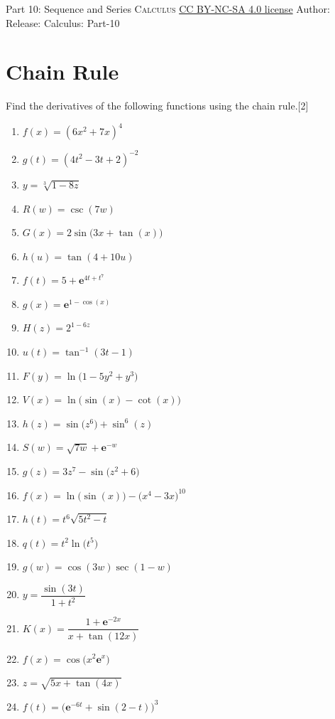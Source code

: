 \newpage\handout
{Part 10: Sequence and Series}
{\textsc{Calculus}}
{\href{https://creativecommons.org/licenses/by-nc-sa/4.0/}{CC BY-NC-SA 4.0 license}}
{Author: \BookAuthor}{Release: \generatedOn}
{Calculus: Part-10}




\section*{Chain Rule}

\begin{multicolblock}{Find the derivatives of the following functions using the chain rule.}[2]
\begin{enumerate}
  \item $f(x)=\left(6x^2+7x\right)^4$
  \item $g(t)=\left(4t^2-3t+2\right)^{-2}$
  \item $y=\sqrt[3]{1-8z}$
  \item $R(w)=\csc(7w)$
  \item $G(x)=2\sin\bigl(3x+\tan(x)\bigr)$
  \item $h(u)=\tan(4+10u)$
  \item $f(t)=5+\mathbf{e}^{4t+t^7}$
  \item $g(x)=\mathbf{e}^{1-\cos(x)}$
  \item $H(z)=2^{1-6z}$
  \item $u(t)=\tan^{-1}(3t-1)$
  \item $F(y)=\ln\bigl(1-5y^2+y^3\bigr)$
  \item $V(x)=\ln\bigl(\sin(x)-\cot(x)\bigr)$
  \item $h(z)=\sin\bigl(z^6\bigr)+\sin^6(z)$
  \item $S(w)=\sqrt{7w}+\mathbf{e}^{-w}$
  \item $g(z)=3z^7-\sin\bigl(z^2+6\bigr)$
  \item $f(x)=\ln\bigl(\sin(x)\bigr)-\bigl(x^4-3x\bigr)^{10}$
  \item $h(t)=t^6\sqrt{5t^2-t}$
  \item $q(t)=t^2\ln\bigl(t^5\bigr)$
  \item $g(w)=\cos(3w)\sec(1-w)$
  \item $y=\dfrac{\sin(3t)}{1+t^2}$
  \item $K(x)=\dfrac{1+\mathbf{e}^{-2x}}{x+\tan(12x)}$
  \item $f(x)=\cos\bigl(x^2\mathbf{e}^x\bigr)$
  \item $z=\sqrt{5x+\tan(4x)}$
  \item $f(t)=\bigl(\mathbf{e}^{-6t}+\sin(2-t)\bigr)^3$

\end{enumerate}
\end{multicolblock}
